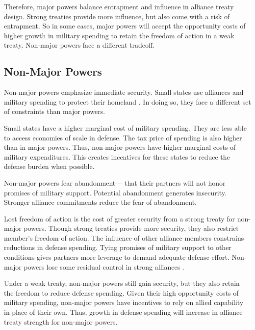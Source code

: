 \documentclass[12pt]{article}
\begin{document}
Therefore, major powers balance entrapment and influence in alliance treaty design. 
Strong treaties provide more influence, but also come with a risk of entrapment. 
So in some cases, major powers will accept the opportunity costs of higher growth in military spending to retain the freedom of action in a weak treaty. 
Non-major powers face a different tradeoff. 


\subsection{Non-Major Powers} 


Non-major powers emphasize immediate security.
Small states use alliances and military spending to protect their homeland \citep{Morrow1991}. 
In doing so, they face a different set of constraints than major powers. 


Small states have a higher marginal cost of military spending. 
They are less able to access economies of scale in defense. 
The tax price of spending is also higher than in major powers. 
Thus, non-major powers have higher marginal costs of military expenditures. 
This creates incentives for these states to reduce the defense burden when possible.


Non-major powers fear abandonment--- that their partners will not honor promises of military support.
Potential abandonment generates insecurity. 
Stronger alliance commitments reduce the fear of abandonment. 


Lost freedom of action is the cost of greater security from a strong treaty for non-major powers.
Though strong treaties provide more security, they also restrict member's freedom of action. 
The influence of other alliance members constrains reductions in defense spending.
Tying promises of military support to other conditions gives partners more leverage to demand adequate defense effort. 
Non-major powers lose some residual control in strong alliances \citep{Lake1996}. 


Under a weak treaty, non-major powers still gain security, but they also retain the freedom to reduce defense spending.    
Given their high opportunity costs of military spending, non-major powers have incentives to rely on allied capability in place of their own. 
Thus, growth in defense spending will increase in alliance treaty strength for non-major powers. 
\end{document}
